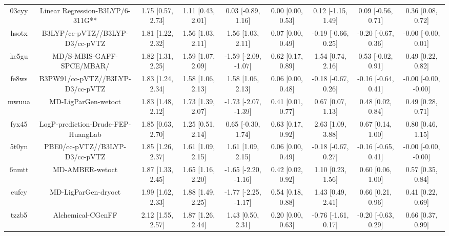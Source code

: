 \documentclass{article}
\begin{document}
\begin{center}
\begin{longtable}{|ccccccccc|}
 03cyy &                   Linear Regression-B3LYP/6-311G** &  1.75 [0.57, 2.73] &  1.11 [0.43, 2.01] &    0.03 [-0.89, 1.16] &  0.00 [0.00, 0.53] &   0.12 [-1.15, 1.49] &   0.09 [-0.56, 0.71] &     0.36 [0.08, 0.72] \\
 hsotx &                    B3LYP/cc-pVTZ//B3LYP-D3/cc-pVTZ &  1.81 [1.22, 2.32] &  1.56 [1.03, 2.11] &     1.56 [1.03, 2.11] &  0.07 [0.00, 0.49] &  -0.19 [-0.66, 0.25] &  -0.20 [-0.67, 0.36] &   -0.00 [-0.00, 0.01] \\
 ke5gu &                          MD/S-MBIS-GAFF-SPCE/MBAR/ &  1.82 [1.31, 2.25] &  1.59 [1.07, 2.09] &  -1.59 [-2.09, -1.07] &  0.62 [0.17, 0.89] &    1.54 [0.74, 2.16] &   0.53 [-0.02, 0.91] &     0.49 [0.22, 0.82] \\
 fe8ws &                   B3PW91/cc-pVTZ//B3LYP-D3/cc-pVTZ &  1.83 [1.24, 2.34] &  1.58 [1.06, 2.13] &     1.58 [1.06, 2.13] &  0.06 [0.00, 0.48] &  -0.18 [-0.67, 0.26] &  -0.16 [-0.64, 0.41] &  -0.00 [-0.00, -0.00] \\
 mwuua &                                MD-LigParGen-wetoct &  1.83 [1.48, 2.12] &  1.73 [1.39, 2.07] &  -1.73 [-2.07, -1.39] &  0.41 [0.01, 0.77] &    0.67 [0.07, 1.13] &    0.48 [0.02, 0.84] &     0.49 [0.28, 0.71] \\
 fyx45 &                 LogP-prediction-Drude-FEP-HuangLab &  1.85 [0.63, 2.70] &  1.25 [0.51, 2.14] &    0.65 [-0.30, 1.74] &  0.63 [0.17, 0.92] &    2.63 [1.09, 3.88] &    0.67 [0.14, 1.00] &     0.80 [0.46, 1.15] \\
 5t0yn &                     PBE0/cc-pVTZ//B3LYP-D3/cc-pVTZ &  1.85 [1.26, 2.37] &  1.61 [1.09, 2.15] &     1.61 [1.09, 2.15] &  0.06 [0.00, 0.49] &  -0.18 [-0.67, 0.27] &  -0.16 [-0.65, 0.41] &  -0.00 [-0.00, -0.00] \\
 6nmtt &                                    MD-AMBER-wetoct &  1.87 [1.33, 2.45] &  1.65 [1.16, 2.20] &  -1.65 [-2.20, -1.16] &  0.42 [0.02, 0.92] &    1.10 [0.23, 1.56] &    0.60 [0.06, 1.00] &     0.57 [0.35, 0.84] \\
 eufcy &                                MD-LigParGen-dryoct &  1.99 [1.62, 2.33] &  1.88 [1.49, 2.25] &  -1.77 [-2.25, -1.17] &  0.54 [0.18, 0.88] &    1.43 [0.49, 2.41] &    0.66 [0.21, 0.96] &     0.41 [0.22, 0.69] \\
 tzzb5 &                                  Alchemical-CGenFF &  2.12 [1.55, 2.57] &  1.87 [1.26, 2.44] &     1.43 [0.50, 2.31] &  0.20 [0.00, 0.63] &  -0.76 [-1.61, 0.17] &  -0.20 [-0.63, 0.29] &     0.66 [0.37, 0.99] \\

\end{longtable}
\end{center}
\end{document}
